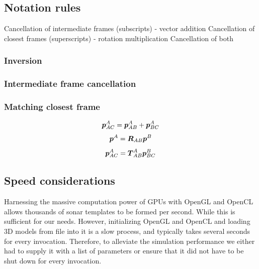 \subsection{Notation rules}

Cancellation of intermediate frames (subscripts)   - vector addition
Cancellation of closest frames      (superscripts) - rotation multiplication
Cancellation of both

\subsubsection{Inversion}


\subsubsection{Intermediate frame cancellation}



\subsubsection{Matching closest frame}

$$\boldsymbol{p}_{AC}^A = \boldsymbol{p}_{AB}^A + \boldsymbol{p}_{BC}^A$$
$$\boldsymbol{p}^A = \boldsymbol{R}_{AB} \boldsymbol{p}^B$$
$$\boldsymbol{p}_{AC}^A = \boldsymbol{T}_{AB}^A \boldsymbol{p}_{BC}^B$$


\subsection{Speed considerations}

Harnessing the massive computation power of GPUs with OpenGL and OpenCL allows thousands of sonar templates to be formed per second. While this is sufficient for our needs. However, initializing OpenGL and OpenCL and loading 3D models from file into it is a slow process, and typically takes several seconds for every invocation. Therefore, to alleviate the simulation performance we either had to supply it with a list of parameters or ensure that it did not have to be shut down for every invocation. 



